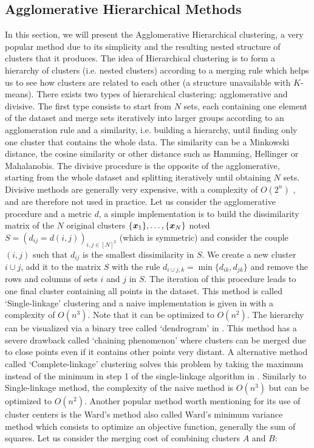 \subsection{Agglomerative Hierarchical Methods}
In this section, we will present the Agglomerative Hierarchical clustering, a very popular method due to its simplicity and the resulting nested structure of clusters that it produces. The idea of Hierarchical clustering is to form a hierarchy of clusters (i.e. nested clusters) according to a merging rule which helps us to see how clusters are related to each other (a structure unavailable with $K$-means). There exists two types of hierarchical clustering: agglomerative and divisive. The first type consists to start from $N$ sets, each containing one element of the dataset and merge sets iteratively into larger groups according to an agglomeration rule and a similarity, i.e. building a hierarchy, until finding only one cluster that contains the whole data. The similarity can be a Minkowski distance, the cosine similarity or other distance such as Hamming, Hellinger or Mahalanobis.  The divisive procedure is the opposite of the agglomerative, starting from the whole dataset and splitting iteratively until obtaining $N$ sets. Divisive methods are generally very expensive, with a complexity of $O(2^n)$ \citep{Guenoche1991} , and are therefore not used in practice. 
Let us consider the agglomerative procedure and a metric $d$, a simple implementation is to build the dissimilarity matrix of the $N$ original clusters $\{\boldsymbol x_1\},\dots,\{\boldsymbol x_N\}$ noted $S=(d_{ij}=d(i,j))_{i,j\in [N]^2}$ (which is symmetric) and consider the couple $(i,j)$ such that $d_{ij}$ is the smallest dissimilarity in $S$. We create a new cluster $i \cup j$, add it to the matrix $S$ with the rule $d_{i\cup j, k}=\min\{d_{ik},d_{jk}\}$ and remove the rows and columns of sets $i$ and $j$ in $S$. The iteration of this procedure leads to one final cluster containing all points in the dataset. This method is called `Single-linkage' clustering \citep{Graham:1985:HMS:1435654.1436662} and a naive implementation is given in  with a complexity of $O(n^3)$. Note that it can be optimized to $O(n^2)$\citep{hierarchicalMurtagh}. The hierarchy can be visualized via a binary tree called `dendrogram' in . This method has a severe drawback called `chaining phenomenon' where clusters can be merged due to close points even if it contains other points very distant. A alternative method called `Complete-linkage' clustering solves this problem by taking the maximum instead of the minimum in step 1 of the single-linkage algorithm in . Similarly to Single-linkage method, the complexity of the naive method is $O(n^3)$ but can be optimized to $O(n^2)$. Another popular method worth mentioning for its use of cluster centers is the Ward's method\citep{ward63} also called Ward's minimum variance method which consists to optimize an objective function, generally the sum of squares. Let us consider the merging cost of combining clusters $A$ and $B$:
